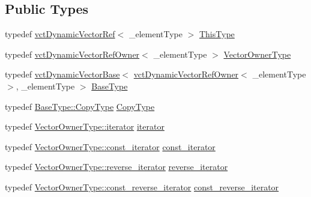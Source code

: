 \subsection*{Public Types}
\begin{DoxyCompactItemize}
\item 
typedef \hyperlink{classvct_dynamic_vector_ref}{vct\+Dynamic\+Vector\+Ref}$<$ \+\_\+element\+Type $>$ \hyperlink{classvct_dynamic_vector_ref_adde8a247e72c476120c26cfa15a37c6d}{This\+Type}
\item 
typedef \hyperlink{classvct_dynamic_vector_ref_owner}{vct\+Dynamic\+Vector\+Ref\+Owner}$<$ \+\_\+element\+Type $>$ \hyperlink{classvct_dynamic_vector_ref_a36c9bed92a3ffb5d3adc86deabbb671e}{Vector\+Owner\+Type}
\item 
typedef \hyperlink{classvct_dynamic_vector_base}{vct\+Dynamic\+Vector\+Base}$<$ \hyperlink{classvct_dynamic_vector_ref_owner}{vct\+Dynamic\+Vector\+Ref\+Owner}$<$ \+\_\+element\+Type $>$, \+\_\+element\+Type $>$ \hyperlink{classvct_dynamic_vector_ref_acebe42b08620767155f3b769ce292163}{Base\+Type}
\item 
typedef \hyperlink{classvct_dynamic_vector_base_a62fcc6341849207c5273566d0bce3cf5}{Base\+Type\+::\+Copy\+Type} \hyperlink{classvct_dynamic_vector_ref_a3d9425849772cea79d6ba9136ae2e3fd}{Copy\+Type}
\item 
typedef \hyperlink{classvct_dynamic_vector_ref_owner_aaee0b96d24843f333909f2aba3aad782}{Vector\+Owner\+Type\+::iterator} \hyperlink{classvct_dynamic_vector_ref_a60db16bd51d6129d93e63c1df05c544e}{iterator}
\item 
typedef \hyperlink{classvct_dynamic_vector_ref_owner_a4f7a05e13925c0eeb1d5c754c3193ba0}{Vector\+Owner\+Type\+::const\+\_\+iterator} \hyperlink{classvct_dynamic_vector_ref_a1ee3349f080cad407612465754d45c38}{const\+\_\+iterator}
\item 
typedef \hyperlink{classvct_dynamic_vector_ref_owner_a3949acd3baa131459d464b058d249990}{Vector\+Owner\+Type\+::reverse\+\_\+iterator} \hyperlink{classvct_dynamic_vector_ref_a4fe85ab37aaaa4b4bd16d4258e91d8b8}{reverse\+\_\+iterator}
\item 
typedef \hyperlink{classvct_dynamic_vector_ref_owner_a9ab3900ecbd8f4d4eb4615a2c9a972a3}{Vector\+Owner\+Type\+::const\+\_\+reverse\+\_\+iterator} \hyperlink{classvct_dynamic_vector_ref_a9600a1990f185ffa4e5a58793a56e8af}{const\+\_\+reverse\+\_\+iterator}
\end{DoxyCompactItemize}
